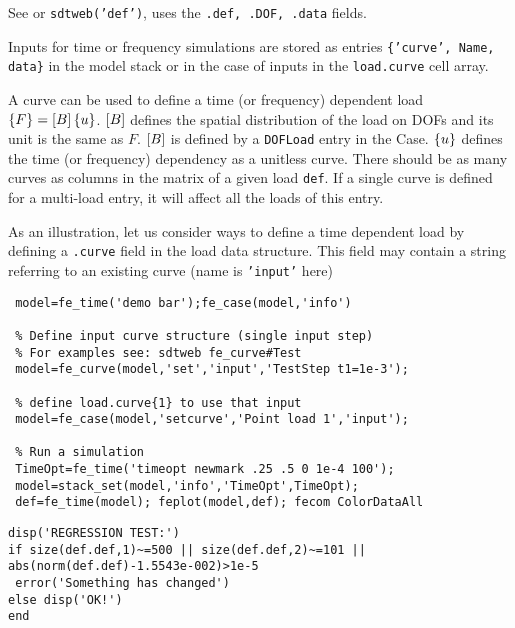 
See  or {\tt sdtweb('def')}, uses the {\tt .def, .DOF, .data} fields. 


Inputs for time or frequency simulations are stored as entries {\tt \{'curve', Name, data\}} in the model stack or in the case of inputs in the {\tt load.curve} cell array. 

A curve can be used to define a time (or frequency) dependent load $\left\{F\right\}=\left[B\right]\left\{u\right\}$. $\left[B\right]$ defines the spatial distribution of the load on DOFs and its unit is the same as $F$. $\left[B\right]$ is defined by a {\tt DOFLoad} entry in the Case. $\left\{u\right\}$ defines the time (or frequency) dependency as a unitless curve. There should be as many curves as columns in the matrix of a given load {\tt def}. If a single curve is defined for a multi-load entry, it will affect all the loads of this entry.

As an illustration, let us consider ways to define a time dependent load by defining a {\tt .curve} field in the load data structure. This field may contain a string referring to an existing curve (name is {\tt 'input'} here)

\begin{verbatim}
 model=fe_time('demo bar');fe_case(model,'info')

 % Define input curve structure (single input step) 
 % For examples see: sdtweb fe_curve#Test 
 model=fe_curve(model,'set','input','TestStep t1=1e-3');

 % define load.curve{1} to use that input
 model=fe_case(model,'setcurve','Point load 1','input');

 % Run a simulation
 TimeOpt=fe_time('timeopt newmark .25 .5 0 1e-4 100');
 model=stack_set(model,'info','TimeOpt',TimeOpt);
 def=fe_time(model); feplot(model,def); fecom ColorDataAll
\end{verbatim}%

\begin{SDTDEV}
\begin{verbatim}
disp('REGRESSION TEST:')
if size(def.def,1)~=500 || size(def.def,2)~=101 || abs(norm(def.def)-1.5543e-002)>1e-5
 error('Something has changed')
else disp('OK!')
end
\end{verbatim}%
\end{SDTDEV}

